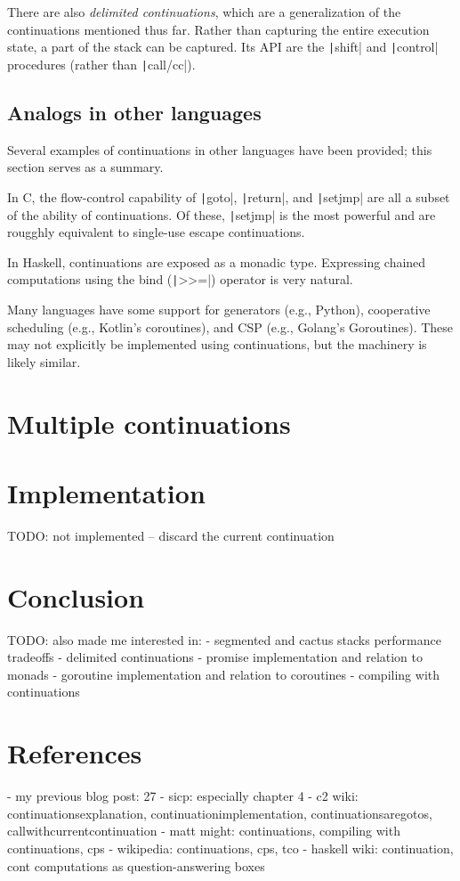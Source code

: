 \documentclass[]{article}
\begin{document}
There are also \textit{delimited continuations}, which are a generalization of the continuations mentioned thus far. Rather than capturing the entire execution state, a part of the stack can be captured. Its API are the \texttt|shift| and \texttt|control| procedures (rather than \texttt|call/cc|).

\subsection{Analogs in other languages}
\label{sec:anal}

Several examples of continuations in other languages have been provided; this section serves as a summary.

In C, the flow-control capability of \texttt|goto|, \texttt|return|, and \texttt|setjmp| are all a subset of the ability of continuations. Of these, \texttt|setjmp| is the most powerful and are rougghly equivalent to single-use escape continuations.

In Haskell, continuations are exposed as a monadic type. Expressing chained computations using the bind (\texttt|>>=|) operator is very natural.

Many languages have some support for generators (e.g., Python), cooperative scheduling (e.g., Kotlin's coroutines), and CSP (e.g., Golang's Goroutines). These may not explicitly be implemented using continuations, but the machinery is likely similar.

\section{Multiple continuations}
\label{sec:mulc}


\section{Implementation}
\label{sec:impl}

TODO: not implemented -- discard the current continuation

\section{Conclusion}
\label{sec:conc}

TODO: also made me interested in:
- segmented and cactus stacks performance tradeoffs
- delimited continuations
- promise implementation and relation to monads
- goroutine implementation and relation to coroutines
- compiling with continuations

\section{References}
\label{sec:refe}

- my previous blog post: 27
- sicp: especially chapter 4
- c2 wiki: continuationsexplanation, continuationimplementation, continuationsaregotos, callwithcurrentcontinuation
- matt might: continuations, compiling with continuations, cps
- wikipedia: continuations, cps, tco
- haskell wiki: continuation, cont computations as question-answering boxes
\end{document}
